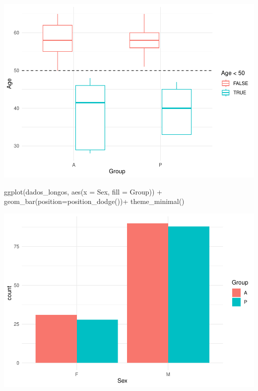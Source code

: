 \documentclass[
]{article}
\newenvironment{Shaded}{\begin{snugshade}}{\end{snugshade}}
\newcommand{\AttributeTok}[1]{\textcolor[rgb]{0.80,0.80,0.80}{#1}}
\newcommand{\FunctionTok}[1]{\textcolor[rgb]{0.94,0.94,0.56}{#1}}
\newcommand{\NormalTok}[1]{\textcolor[rgb]{0.80,0.80,0.80}{#1}}
\newcommand{\SpecialCharTok}[1]{\textcolor[rgb]{0.86,0.64,0.64}{#1}}
\begin{document}
\includegraphics{EDA__files/figure-latex/unnamed-chunk-5-2.pdf}

\begin{Shaded}
\begin{Highlighting}[]
\FunctionTok{ggplot}\NormalTok{(dados\_longos, }\FunctionTok{aes}\NormalTok{(}\AttributeTok{x =}\NormalTok{ Sex, }\AttributeTok{fill =}\NormalTok{ Group)) }\SpecialCharTok{+} 
  \FunctionTok{geom\_bar}\NormalTok{(}\AttributeTok{position=}\FunctionTok{position\_dodge}\NormalTok{())}\SpecialCharTok{+}
  \FunctionTok{theme\_minimal}\NormalTok{()}
\end{Highlighting}
\end{Shaded}

\includegraphics{EDA__files/figure-latex/unnamed-chunk-5-3.pdf}
\end{document}
